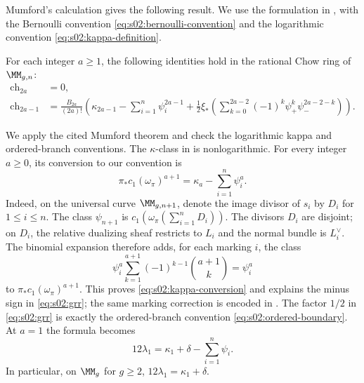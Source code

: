 Mumford's calculation \cite[\S 5, (5.2)--(5.3)]{Mum83} gives the
following result.  We use the formulation in
\cite[\S 1.1, Theorem (Mumford)]{FP00}, with the Bernoulli convention
\eqref{eq:s02:bernoulli-convention} and the logarithmic convention
\eqref{eq:s02:kappa-definition}.

\begin{thm}
\label{thm:s02:grr}
For each integer $a\geq1$, the following identities hold in the
rational Chow ring of $\MM_{g,n}$:
\begin{equation}
\label{eq:s02:grr}
\begin{split}
\mathrm{ch}_{2a}&=0,\\
\mathrm{ch}_{2a-1}
&=\frac{B_{2a}}{(2a)!}
\left(
\kappa_{2a-1}-\sum_{i=1}^n\psi_i^{2a-1}
+\frac12\xi_*\!\left(
\sum_{k=0}^{2a-2}(-1)^k\psi_+^k\psi_-^{2a-2-k}
\right)\right).
\end{split}
\end{equation}
\end{thm}

\begin{prf}
We apply the cited Mumford theorem and check the logarithmic
kappa and ordered-branch conventions. The $\kappa$-class in
\cite{FP00} is nonlogarithmic.  For every integer $a\geq0$, its
conversion to our convention is
\begin{equation}
\label{eq:s02:kappa-conversion}
\pi_*c_1(\omega_\pi)^{a+1}
=\kappa_a-\sum_{i=1}^n\psi_i^a.
\end{equation}
Indeed, on the universal curve $\MM_{g,n+1}$, denote the image
divisor of $s_i$ by $D_i$ for $1\leq i\leq n$.
The class $\psi_{n+1}$ is
$c_1(\omega_\pi(\sum_{i=1}^nD_i))$.  The divisors $D_i$ are
disjoint; on $D_i$, the relative dualizing sheaf restricts to $L_i$
and the normal bundle is $L_i^\vee$.  The binomial expansion therefore
adds, for each marking $i$, the class
\[
\psi_i^a\sum_{k=1}^{a+1}(-1)^{k-1}\binom{a+1}{k}
=\psi_i^a
\]
to $\pi_*c_1(\omega_\pi)^{a+1}$.  This proves
\eqref{eq:s02:kappa-conversion} and explains the minus sign in
\eqref{eq:s02:grr}; the same marking correction is encoded in
\cite[\S 1.3, (16)]{FP00}.  The factor $1/2$ in
\eqref{eq:s02:grr} is exactly the ordered-branch convention
\eqref{eq:s02:ordered-boundary}.  At $a=1$ the formula becomes
\begin{equation}
\label{eq:s02:lambda-one-grr}
12\lambda_1=\kappa_1+\delta-\sum_{i=1}^n\psi_i.
\end{equation}
In particular, on $\MM_g$ for $g\geq2$,
$12\lambda_1=\kappa_1+\delta$.
\end{prf}

